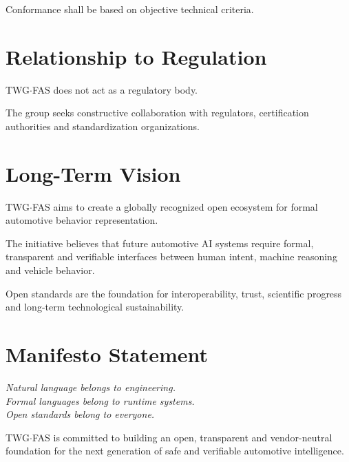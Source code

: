 \documentclass[11pt,a4paper]{article}
\begin{document}
Conformance shall be based on objective technical criteria.

\section{Relationship to Regulation}

TWG$\cdot$FAS does not act as a regulatory body.

The group seeks constructive collaboration with regulators,
certification authorities and standardization organizations.

\section{Long-Term Vision}

TWG$\cdot$FAS aims to create a globally recognized open ecosystem for
formal automotive behavior representation.

The initiative believes that future automotive AI systems require
formal, transparent and verifiable interfaces between human intent,
machine reasoning and vehicle behavior.

Open standards are the foundation for interoperability, trust,
scientific progress and long-term technological sustainability.

\section{Manifesto Statement}

\emph{
Natural language belongs to engineering.\\
Formal languages belong to runtime systems.\\
Open standards belong to everyone.
}

\vspace{1em}

TWG$\cdot$FAS is committed to building an open, transparent and
vendor-neutral foundation for the next generation of safe and
verifiable automotive intelligence.
\end{document}
